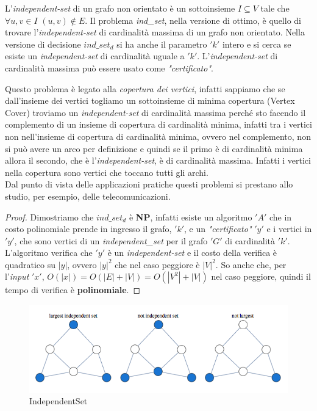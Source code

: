 			\begin{definizione}
				L'\textit{independent-set } di un grafo non orientato è un sottoinsieme
				$I\subseteq V$ tale che $\forall u,v\in I$ $(u,v)\not\in E$. Il problema
				\textit{ind\_set}, nella versione di ottimo, è quello di trovare
				l'\textit{independent-set} di cardinalità massima di un grafo non
				orientato. Nella versione di decisione $ind\_set_d$ si ha anche il parametro
				$ 'k' $ intero e si cerca se esiste un \textit{independent-set} di cardinalità
				uguale a $ 'k' $. L'\textit{independent-set} di cardinalità massima può essere
				usato come \textit{"certificato"}.
			\end{definizione}
			Questo problema è legato alla \textit{copertura dei vertici}, infatti sappiamo
			che se dall'insieme dei vertici togliamo un sottoinsieme di minima copertura (Vertex Cover)
			troviamo un \textit{independent-set} di cardinalità massima perché sto facendo
			il complemento di un insieme di copertura di cardinalità minima, infatti tra i
			vertici non nell'insieme di copertura di cardinalità minima, ovvero nel
			complemento, non si può avere un arco per definizione e quindi se il primo è di
			cardinalità minima allora il secondo, che è l'\textit{independent-set}, è di
			cardinalità massima. Infatti i vertici nella copertura sono vertici che toccano
			tutti gli archi.\\
			Dal punto di vista delle applicazioni pratiche questi problemi si prestano allo
			studio, per esempio, delle telecomunicazioni.
			\begin{proof}
				Dimostriamo che $ind\_set_d$ è \textbf{NP}, infatti esiste un algoritmo $ 'A' $
				che in costo polinomiale prende in ingresso il grafo, $ 'k' $, e un
				\textit{"certificato"} $ 'y' $ e i vertici in $ 'y' $, che sono vertici di un
				\textit{independent\_set} per il grafo $ 'G' $ di cardinalità $ 'k' $. L'algoritmo
				verifica che $ 'y' $ è un \textit{independent-set} e il costo della verifica è
				quadratico su $|y|$, ovvero $|y|^2$ che nel caso peggiore è $|V|^2$. So anche
				che, per l'\textit{input} $ 'x' $, $O(|x|)=O(|E|+|V|)=O(|V^2|+|V|)$ nel caso peggiore,
				quindi il tempo di verifica è \textbf{polinomiale}.
			\end{proof}
			\begin{figure}[h!]
				\centering
				\includegraphics[width=1\textwidth]{img/independentSet.png}
				\caption{IndependentSet}
				\label{fig:IndependentSets}
			\end{figure}

